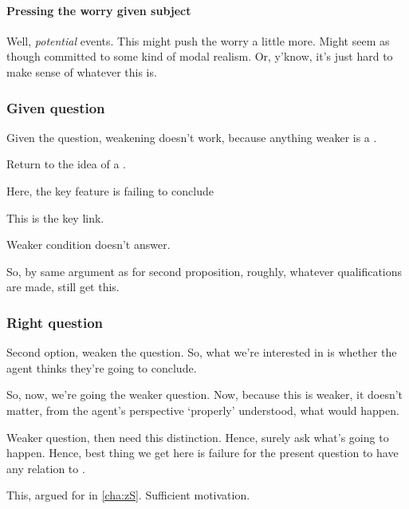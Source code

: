 \newpage

\paragraph{Pressing the worry given subject}

\begin{note}
  Well, \emph{potential} events.
  This might push the worry a little more.
  Might seem as though committed to some kind of modal realism.
  Or, y'know, it's just hard to make sense of whatever this is.
\end{note}

\subsubsection{Given question}
\label{sec:given-question}

\begin{note}
  Given the question, weakening doesn't work, because anything weaker is a \requ{}.
\end{note}

\begin{note}
  Return to the idea of a \requ{}.

  Here, the key feature is failing to conclude

  This is the key link.

  Weaker condition doesn't answer.

  So, by same argument as for second proposition, roughly, whatever qualifications are made, still get this.
\end{note}

\subsubsection{Right question}
\label{sec:right-question}

\begin{note}
  Second option, weaken the question.
  So, what we're interested in is whether the agent thinks they're going to conclude.

  So, now, we're going the weaker question.
  Now, because this is weaker, it doesn't matter, from the agent's perspective `properly' understood, what would happen.

  Weaker question, then need this distinction.
  Hence, surely ask what's going to happen.
  Hence, best thing we get here is failure for the present question to have any relation to \qWhy{}.

  This, argued for in \autoref{cha:zS}.
  Sufficient motivation.
\end{note}

